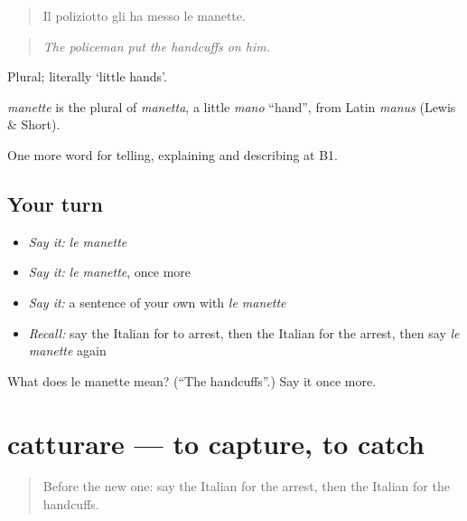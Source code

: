 \begin{quote}
Il poliziotto gli ha messo le manette.
\end{quote}

\begin{quote}
\emph{The policeman put the handcuffs on him.}
\end{quote}

Plural; literally ‘little hands’.

\begin{cousinweb}
\emph{manette} is the plural of \emph{manetta}, a little \emph{mano} \textquotedblleft{}hand\textquotedblright{}, from Latin \emph{manus} (Lewis \& Short).
\end{cousinweb}

\begin{grammarlens}[title={What you've built}]
One more word for telling, explaining and describing at B1.
\end{grammarlens}

\subsection*{Your turn}
\begin{itemize}
\raggedright
  \item \emph{Say it:} \emph{le manette}
  \item \emph{Say it:} \emph{le manette}, once more
  \item \emph{Say it:} a sentence of your own with \emph{le manette}
  \item \emph{Recall:} say the Italian for to arrest, then the Italian for the arrest, then say \emph{le manette} again
\end{itemize}

\begin{tcolorbox}[breakable,colback=teal!4,colframe=teal!35!black,title={Before you move on}]
What does le manette mean? (\textquotedblleft{}The handcuffs\textquotedblright{}.) Say it once more.
\end{tcolorbox}
\section[catturare]{catturare — to capture, to catch}

\label{lesson:IT-C297-catturare}



\begin{quote}
Before the new one: say the Italian for the arrest, then the Italian for the handcuffs.
\end{quote}

